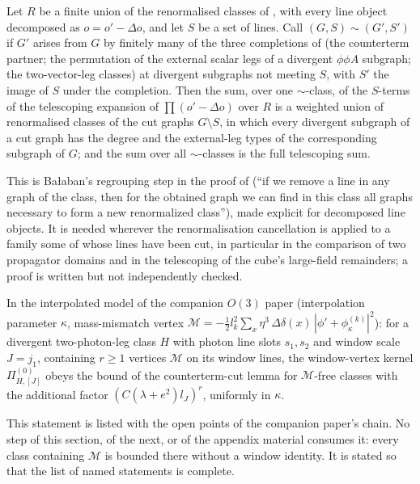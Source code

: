 \begin{hypothesis}\label{hyp:k01:RENorb}
Let $R$ be a finite union of the renormalised classes of \cite[Sects.~2--3]{Ba3}, with every line object decomposed as $o=o'-\Delta o$, and let $S$ be a set of lines. Call $(G,S)\sim(G',S')$ if $G'$ arises from $G$ by finitely many of the three completions of \cite[pp.~420, 429--432]{Ba3} (the counterterm partner; the permutation of the external scalar legs of a divergent $\phi\phi A$ subgraph; the two-vector-leg classes) at divergent subgraphs not meeting $S$, with $S'$ the image of $S$ under the completion. Then the sum, over one $\sim$-class, of the $S$-terms of the telescoping expansion of $\prod(o'-\Delta o)$ over $R$ is a weighted union of renormalised classes of the cut graphs $G\setminus S$, in which every divergent subgraph of a cut graph has the degree and the external-leg types of the corresponding subgraph of $G$; and the sum over all $\sim$-classes is the full telescoping sum.
\end{hypothesis}
This is Ba{\l}aban's regrouping step in the proof of \cite[Prop.~1, p.~432]{Ba3} (``if we remove a line in any graph of the class, then for the obtained graph we can find in this class all graphs necessary to form a new renormalized class''), made explicit for decomposed line objects. It is needed wherever the renormalisation cancellation is applied to a family some of whose lines have been cut, in particular in the comparison of two propagator domains and in the telescoping of the cube's large-field remainders; a proof is written but not independently checked.

\begin{hypothesis}\label{hyp:k01:CUTM}
In the interpolated model of the companion $O(3)$ paper \cite{RotO3} (interpolation parameter $\kappa$, mass-mismatch vertex $\mathcal M=-\tfrac12l_k^2\sum_x\eta^3\,\Delta\delta(x)\,|\phi'+\phi^{(k)}_\kappa|^2$): for a divergent two-photon-leg class $H$ with photon line slots $s_1,s_2$ and window scale $J=j_1$, containing $r\ge1$ vertices $\mathcal M$ on its window lines, the window-vertex kernel $\Pi^{(0)}_{H,[J]}$ obeys the bound of the counterterm-cut lemma for $\mathcal M$-free classes with the additional factor $(C(\lambda+e^2)l_J)^r$, uniformly in $\kappa$.
\end{hypothesis}
This statement is listed with the open points of the companion paper's chain. No step of this section, of the next, or of the appendix material consumes it: every class containing $\mathcal M$ is bounded there without a window identity. It is stated so that the list of named statements is complete.

